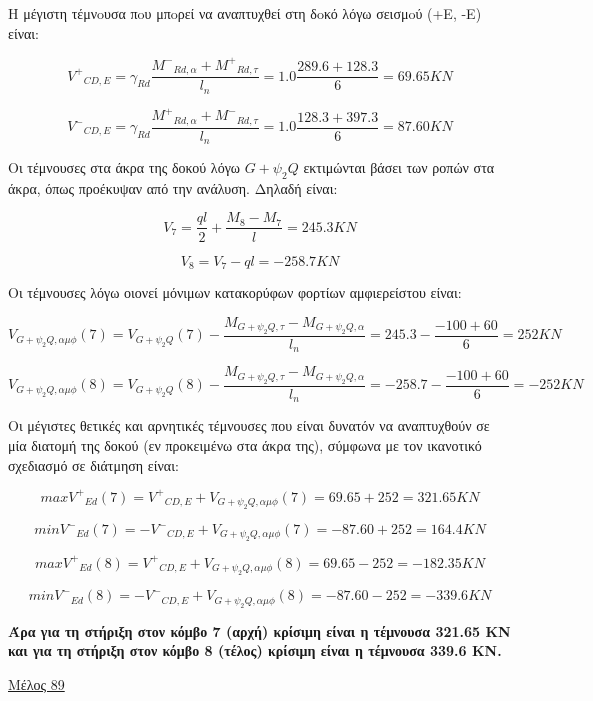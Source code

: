 \bigskip

\noindent
Η μέγιστη τέμνoυσα πoυ μπoρεί να αναπτυχθεί στη δoκό λόγω σεισμoύ (+E, -E) είναι:

\[
{V^{+}}_{CD,E} = \gamma_{Rd}\dfrac{{M^{-}}_{Rd,\alpha} + {M^{+}}_{Rd,\tau}}{l_n} = 1.0\dfrac{289.6 + 128.3}{6} = 69.65 KN
\]

\[
{V^{-}}_{CD,E} = \gamma_{Rd}\dfrac{{M^{+}}_{Rd,\alpha} + {M^{-}}_{Rd,\tau}}{l_n} = 1.0\dfrac{128.3 + 397.3}{6} = 87.60 KN
\]

\noindent
Οι τέμνουσες στα άκρα της δοκού λόγω $G+\psi_2Q$ εκτιμώνται βάσει των ροπών στα άκρα, όπως προέκυψαν από την ανάλυση. Δηλαδή είναι:

\[
V_7 = \dfrac{ql}{2} + \dfrac{M_8 - Μ_7}{l} = 245.3 KN
\]

\[
V_8 = V_7 - ql = -258.7 KN
\]

\noindent
Οι τέμνουσες λόγω οιονεί μόνιμων κατακορύφων φορτίων αμφιερείστου είναι:

\[
V_{G+\psi_2Q,\alpha\mu\phi}(7) = V_{G+\psi_2Q}(7) - \dfrac{M_{G+\psi_2Q,\tau}- M_{G+\psi_2Q,\alpha}}{l_n} = 245.3 - \dfrac{-100+60}{6}= 252KN
\]

\[
V_{G+\psi_2Q,\alpha\mu\phi}(8) = V_{G+\psi_2Q}(8) - \dfrac{M_{G+\psi_2Q,\tau}- M_{G+\psi_2Q,\alpha}}{l_n} = -258.7 - \dfrac{-100+60}{6}= -252KN
\]

\noindent
Οι μέγιστες θετικές και αρνητικές τέμνουσες που είναι δυνατόν να αναπτυχθούν σε μία διατομή της δοκού (εν προκειμένω στα άκρα της), σύμφωνα με τον ικανοτικό σχεδιασμό σε διάτμηση είναι:

\[
max{V^{+}}_{Ed} (7) = {V^{+}}_{CD,E} + V_{G+\psi_2Q,\alpha\mu\phi}(7) = 69.65 + 252 = 321.65 KN
\]

\[
min{V^{-}}_{Ed} (7) = -{V^{-}}_{CD,E} + V_{G+\psi_2Q,\alpha\mu\phi}(7) = -87.60 + 252 = 164.4 KN
\]

\[
max{V^{+}}_{Ed} (8) = {V^{+}}_{CD,E} + V_{G+\psi_2Q,\alpha\mu\phi}(8) = 69.65 - 252 = -182.35 KN
\]

\[
min{V^{-}}_{Ed} (8) = -{V^{-}}_{CD,E} + V_{G+\psi_2Q,\alpha\mu\phi}(8) = -87.60 - 252 = -339.6 KN
\]

\bigskip

\noindent\textbf{\textcolor{mygreen}{Άρα για τη στήριξη στον κόμβο 7 (αρχή) κρίσιμη είναι η τέμνουσα 321.65 KN και για τη στήριξη στον κόμβο 8 (τέλος) κρίσιμη είναι η τέμνουσα 339.6 KN.}}

\bigskip

\noindent
\underline{Μέλος 89}

\bigskip


